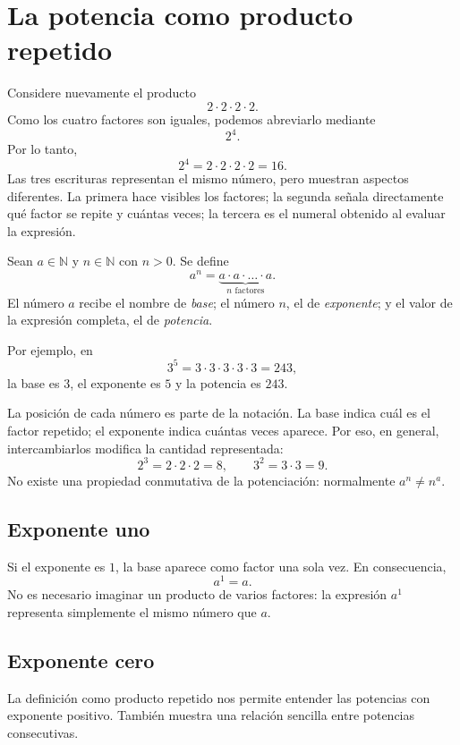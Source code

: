 \section{La potencia como producto repetido}

Considere nuevamente el producto
\[
2\cdot2\cdot2\cdot2.
\]
Como los cuatro factores son iguales, podemos abreviarlo mediante
\[
2^4.
\]
Por lo tanto,
\[
2^4=2\cdot2\cdot2\cdot2=16.
\]
Las tres escrituras representan el mismo número, pero muestran aspectos diferentes. La primera hace visibles los factores; la segunda señala directamente qué factor se repite y cuántas veces; la tercera es el numeral obtenido al evaluar la expresión.

\begin{definitionbox}
Sean \(a\in\mathbb N\) y \(n\in\mathbb N\) con \(n>0\). Se define
\[
a^n=
\underbrace{a\cdot a\cdot\ldots\cdot a}_{n\text{ factores}}.
\]
El número \(a\) recibe el nombre de \emph{base}; el número \(n\), el de \emph{exponente}; y el valor de la expresión completa, el de \emph{potencia}.
\end{definitionbox}

Por ejemplo, en
\[
3^5=3\cdot3\cdot3\cdot3\cdot3=243,
\]
la base es \(3\), el exponente es \(5\) y la potencia es \(243\).

La posición de cada número es parte de la notación. La base indica cuál es el factor repetido; el exponente indica cuántas veces aparece. Por eso, en general, intercambiarlos modifica la cantidad representada:
\[
2^3=2\cdot2\cdot2=8,
\qquad
3^2=3\cdot3=9.
\]
No existe una propiedad conmutativa de la potenciación: normalmente \(a^n\ne n^a\).

\subsection{Exponente uno}

Si el exponente es \(1\), la base aparece como factor una sola vez. En consecuencia,
\[
a^1=a.
\]
No es necesario imaginar un producto de varios factores: la expresión \(a^1\) representa simplemente el mismo número que \(a\).

\subsection{Exponente cero}

La definición como producto repetido nos permite entender las potencias con exponente positivo. También muestra una relación sencilla entre potencias consecutivas.

